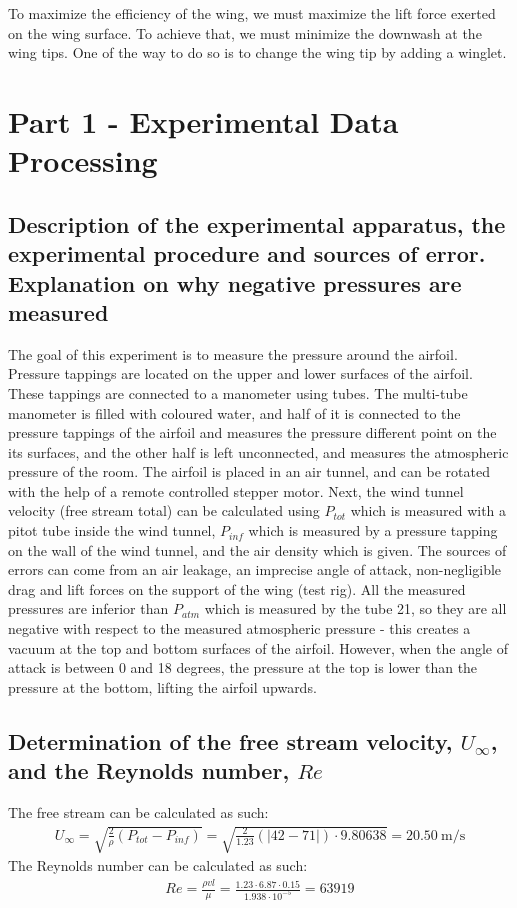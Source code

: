 To maximize the efficiency of the wing, we must maximize the lift force exerted on the wing surface. To achieve that, we must minimize the downwash at the wing tips. One of the way to do so is to change the wing tip by adding a winglet.
\section{Part 1 - Experimental Data Processing}
\subsection{Description of the experimental apparatus, the experimental procedure and sources of error. Explanation on why negative pressures are measured}
The goal of this experiment is to measure the pressure around the airfoil. Pressure tappings are located on the upper and lower surfaces of the airfoil. These tappings are connected to a manometer using tubes. The multi-tube manometer is filled with coloured water, and half of it is connected to the pressure tappings of the airfoil and measures the pressure different point on the its surfaces, and the other half is left unconnected, and measures the atmospheric pressure of the room. The airfoil is placed in an air tunnel, and can be rotated with the help of a remote controlled stepper motor. Next, the wind tunnel velocity (free stream total) can be calculated using $P_{tot}$ which is measured with a pitot tube inside the wind tunnel, $P_{inf}$ which is measured by a pressure tapping on the wall of the wind tunnel, and the air density which is given. The sources of errors can come from an air leakage, an imprecise angle of attack, non-negligible drag and lift forces on the support of the wing (test rig). All the measured pressures are inferior than $P_{atm}$ which is measured by the tube 21, so they are all negative with respect to the measured atmospheric pressure - this creates a vacuum at the top and bottom surfaces of the airfoil. However, when the angle of attack is between 0 and 18 degrees, the pressure at the top is lower than the pressure at the bottom, lifting the airfoil upwards.
\subsection{Determination of the free stream velocity, $U_{\infty}$, and the Reynolds number, $Re$}
The free stream can be calculated as such:
\begin{align}
    U_{\infty} = \sqrt{\frac{2}{\rho}\left(P_{tot} - P_{inf}\right)} = \sqrt{\frac{2}{1.23}\left( \left| 42-71 \right| \right) \cdot 9.80638} = \SI{20.50}{\meter\per\second}
\end{align}
The Reynolds number can be calculated as such:
\begin{align}
    Re = \frac{\rho v l}{\mu} = \frac{1.23 \cdot 6.87 \cdot 0.15}{1.938\cdot 10^{-5}} = 63919
\end{align}
